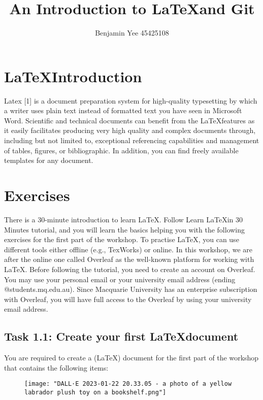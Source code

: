\documentclass[12pt, a4paper]{article}
\begin{document}
	\title{An Introduction to \LaTeX and Git}
	\author{Benjamin Yee 45425108}
	\maketitle
	
	\tableofcontents
	
	\section{\LaTeX Introduction}
	
	Latex [1] is a document preparation system for high-quality typesetting by which
	a writer uses plain text instead of formatted text you have seen in Microsoft
	Word. Scientific and technical documents can benefit from the \LaTeX features as
	it easily facilitates producing very high quality and complex documents through,
	including but not limited to, exceptional referencing capabilities and management of tables, figures, or bibliographic. In addition, you can find freely available
	templates for any document.
	
	\section*{Exercises}
	There is a 30-minute introduction to learn \LaTeX . Follow Learn \LaTeX in 30
	Minutes tutorial, and you will learn the basics helping you with the following
	exercises for the first part of the workshop.
	To practise \LaTeX , you can use different tools either offline (e.g., TexWorks)
	or online. In this workshop, we are after the online one called Overleaf as the
	well-known platform for working with \LaTeX . Before following the tutorial, you
	need to create an account on Overleaf. You may use your personal email or
	your university email address (ending @students.mq.edu.au). Since Macquarie
	University has an enterprise subscription with Overleaf, you will have full access
	to the Overleaf by using your university email address.
	
	\subsection{Task 1.1: Create your first \LaTeX document}
	You are required to create a (\LaTeX) document for the first part of the workshop
	that contains the following items:
	
	\begin{figure}[h]
		\centering
		\texttt{[image: "DALL·E 2023-01-22 20.33.05 - a photo of a yellow labrador plush toy on a bookshelf.png"]}
	\end{figure}
\end{document}

